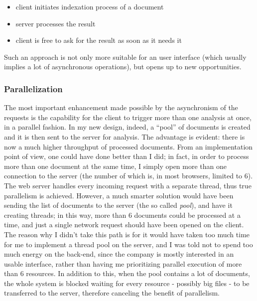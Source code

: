 \documentclass[12pt,oneside,svgnames]{memoir}
\begin{document}
\begin{itemize}
\itemsep1pt\parskip0pt
\item
  client initiates indexation process of a document
\item
  server processes the result
\item
  client is free to ask for the result as soon as it needs it
\end{itemize}

Such an approach is not only more suitable for an user interface (which
usually implies a lot of asynchronous operations), but opens up to new
opportunities.

\subsubsection*{Parallelization}\label{parallelization}

The most important enhancement made possible by the asynchronism of the
requests is the capability for the client to trigger more than one
analysis at once, in a parallel fashion. In my new design, indeed, a
``pool'' of documents is created and it is then sent to the server for
analysis. The advantage is evident: there is now a much higher
throughput of processed documents. From an implementation point of view,
one could have done better than I did; in fact, in order to process more
than one document at the same time, I simply open more than one
connection to the server (the number of which is, in most browsers,
limited to 6). The web server handles every incoming request with a
separate thread, thus true parallelism is achieved. However, a much
smarter solution would have been sending the list of documents to the
server (the so called \emph{pool}), and have it creating threads; in
this way, more than 6 documents could be processed at a time, and just a
single network request should have been opened on the client. The reason
why I didn't take this path is for it would have taken too much time for
me to implement a thread pool on the server, and I was told not to spend
too much energy on the back-end, since the company is mostly interested
in an usable interface, rather than having me prioritizing parallel
execution of more than 6 resources. In addition to this, when the pool
contains a lot of documents, the whole system is blocked waiting for
every resource - possibly big files - to be transferred to the server,
therefore canceling the benefit of parallelism.
\end{document}
